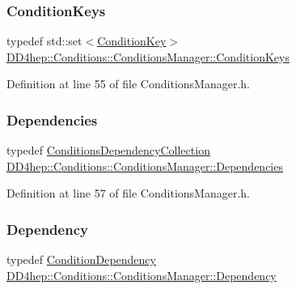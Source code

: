 \subsubsection{\texorpdfstring{Condition\+Keys}{ConditionKeys}}
{\footnotesize\ttfamily typedef std\+::set$<$\hyperlink{class_d_d4hep_1_1_conditions_1_1_condition_key}{Condition\+Key}$>$ \hyperlink{class_d_d4hep_1_1_conditions_1_1_conditions_manager_a8dd76f9acef2c8d3b7970e266fe7eff6}{D\+D4hep\+::\+Conditions\+::\+Conditions\+Manager\+::\+Condition\+Keys}}



Definition at line 55 of file Conditions\+Manager.\+h.

\hypertarget{class_d_d4hep_1_1_conditions_1_1_conditions_manager_aab778cfbe096ae8ad20a0bdbb047ad32}{}\label{class_d_d4hep_1_1_conditions_1_1_conditions_manager_aab778cfbe096ae8ad20a0bdbb047ad32} 
\subsubsection{\texorpdfstring{Dependencies}{Dependencies}}
{\footnotesize\ttfamily typedef \hyperlink{class_d_d4hep_1_1_conditions_1_1_conditions_dependency_collection}{Conditions\+Dependency\+Collection} \hyperlink{class_d_d4hep_1_1_conditions_1_1_conditions_manager_aab778cfbe096ae8ad20a0bdbb047ad32}{D\+D4hep\+::\+Conditions\+::\+Conditions\+Manager\+::\+Dependencies}}



Definition at line 57 of file Conditions\+Manager.\+h.

\hypertarget{class_d_d4hep_1_1_conditions_1_1_conditions_manager_a8787c205ff23a5883d7bf98f9b06b408}{}\label{class_d_d4hep_1_1_conditions_1_1_conditions_manager_a8787c205ff23a5883d7bf98f9b06b408} 
\subsubsection{\texorpdfstring{Dependency}{Dependency}}
{\footnotesize\ttfamily typedef \hyperlink{class_d_d4hep_1_1_conditions_1_1_condition_dependency}{Condition\+Dependency} \hyperlink{class_d_d4hep_1_1_conditions_1_1_conditions_manager_a8787c205ff23a5883d7bf98f9b06b408}{D\+D4hep\+::\+Conditions\+::\+Conditions\+Manager\+::\+Dependency}}




